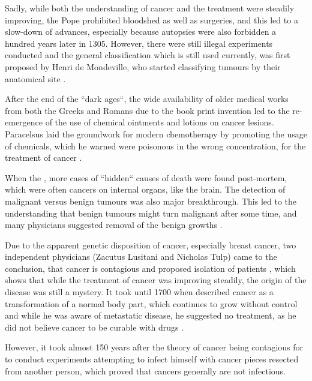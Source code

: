 Sadly, while both the understanding of cancer and the treatment were steadily improving, the Pope prohibited bloodshed as well as surgeries, and this led to a slow-down of advances, especially because autopsies were also forbidden a hundred years later in 1305. However, there were still illegal experiments conducted and the general classification which is still used currently, was first proposed by Henri de Mondeville, who started classifying tumours by their anatomical site \cite{Pilcher1895}.

After the end of the ``dark ages``, the wide availability of older medical works from both the Greeks and Romans due to the book print invention led to the re-emergence of the use of chemical ointments and lotions on cancer lesions. Paracelsus laid the groundwork for modern chemotherapy by promoting the usage of chemicals, which he warned were poisonous in the wrong concentration, for the treatment of cancer \cite{PHT1562}.

When the , more cases of ``hidden`` causes of death were found post-mortem, which were often cancers on internal organs, like the brain. The detection of malignant versus benign tumours was also  major breakthrough. This led to the understanding that  benign tumours might turn malignant after some time, and many physicians suggested  removal of the benign growths \cite{Severino1632}.

Due to the apparent genetic disposition of cancer, especially breast cancer, two independent physicians (Zacutus Lusitani and Nicholas Tulp) came to the conclusion, that cancer is contagious and proposed  isolation of patients \cite{Lusitani1649,Tulpii1652}, which shows that while the treatment of cancer was improving steadily, the origin of the disease was still a mystery. It took until 1700 when \citeauthor{DeshaiesGendron1701} described cancer as a transformation of a normal body part, which continues to grow without control and while he was aware of metastatic disease, he suggested no treatment, as he did not believe cancer to be curable with drugs \cite{DeshaiesGendron1701}. 

However, it took almost 150 years after the theory of cancer being contagious for \textcite{Nooth1804} to conduct experiments attempting to infect himself with cancer pieces resected from another person, which proved that cancers generally are not infectious.

